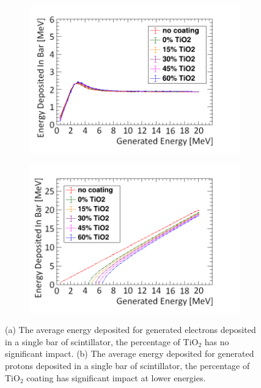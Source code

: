 \begin{figure}[!h]
\centering
\begin{subfigure}{.5\textwidth}
  \centering
  \includegraphics[width=\linewidth]{Chapter4/Figs/Raster/electronEdepTiO2Coating.png}
  \captionsetup{width=.9\linewidth}
  \caption{}
  \label{subFig:proton_TiO2}
\end{subfigure}%
\begin{subfigure}{.5\textwidth}
  \centering
  \includegraphics[width=\linewidth]{Chapter4/Figs/Raster/protonsEdepTiO2Coating.png}
  \captionsetup{width=.9\linewidth}
  \caption{}
  \label{subFig:muon_TiO2}
\end{subfigure}
\caption[Energy deposition for electrons and protons in a TiO$_2$ coated bar.]{(a) The average energy deposited for generated electrons deposited in a single bar of scintillator, the percentage of TiO$_2$ has no significant impact. (b) The average energy deposited for generated protons deposited in a single bar of scintillator, the percentage of TiO$_2$ coating has significant impact at lower energies.}
\label{fig:muonProton_TiO2}
\end{figure}


